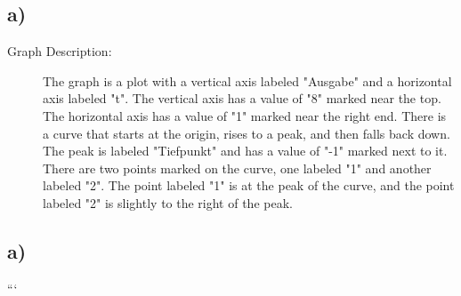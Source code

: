 

\subsection*{a)}

\begin{description}
    \item[Graph Description:] The graph is a plot with a vertical axis labeled "Ausgabe" and a horizontal axis labeled "t". The vertical axis has a value of "8" marked near the top. The horizontal axis has a value of "1" marked near the right end. There is a curve that starts at the origin, rises to a peak, and then falls back down. The peak is labeled "Tiefpunkt" and has a value of "-1" marked next to it. There are two points marked on the curve, one labeled "1" and another labeled "2". The point labeled "1" is at the peak of the curve, and the point labeled "2" is slightly to the right of the peak.
\end{description}



\subsection*{a)}

```